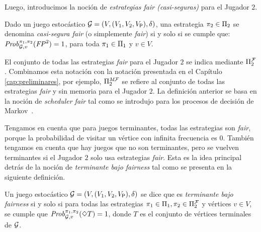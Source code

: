 
Luego, introducimos la noción de \emph{estrategias fair (casi-seguras)} para el Jugador $2$.
\begin{definition} Dado un juego estocástico $\mathcal{G} = (V, (V_1, V_2, V_{\mathsf{P}}), \delta)$,
una estrategia $\pi_{2} \in \Pi_{2}$ se denomina \emph{casi-segura fair} (o simplemente \emph{fair}) si y solo si se cumple que:
$\mathit{Prob}^{\pi_{1}, \pi_{2}}_{\mathcal{G},v}(\mathit{FP}^2) = 1$,
para toda $\pi_{1} \in \Pi_{1}$ y $v \in V$. 
\end{definition}
%
El conjunto de todas las estrategias \textit{fair} para el Jugador $2$ se indica mediante $\Pi^{\mathcal{F}}_{2}$. Combinamos esta notación con la notación presentada en el Capítulo \ref{cap:preliminares}, por ejemplo, $\Pi^{\textit{M}\mathcal{F}}_{2}$ se refiere al conjunto de todas las estrategias \textit{fair} y sin memoria para el Jugador $2$.
%
La definición anterior se basa en la noción de \textit{scheduler fair} tal como se introdujo para los procesos de decisión de Markov~\cite{DBLP:journals/dc/BaierK98,BaierK08}.

Tengamos en cuenta que para juegos terminantes, todas las estrategias son \textit{fair}, porque la probabilidad de visitar un vértice con infinita frecuencia es $0$.
%
También tengamos en cuenta que hay juegos que no son terminantes, pero se vuelven terminantes si el Jugador $2$ solo usa estrategias \textit{fair}. Esta es la idea principal detrás de la noción de \emph{terminante bajo fairness} tal como se presenta en la siguiente definición.

	
\begin{definition}\label{def:stopping-under-fairness}
  Un juego estocástico $\mathcal{G} = (V, (V_1, V_2, V_{\mathsf{P}}), \delta)$ se dice que es \emph{terminante bajo fairness} si y solo si para todas las estrategias $\pi_{1} \in \Pi_{1}, \pi_{2} \in \Pi^{\mathcal{F}}_{2}$ y vértices $v \in V$, se cumple que
  $\mathit{Prob}^{\pi_{1}, \pi_{2}}_{\mathcal{G},v}(\Diamond T)=1$,  donde $T$ es el conjunto de vértices terminales de $\mathcal{G}$. 
\end{definition}

